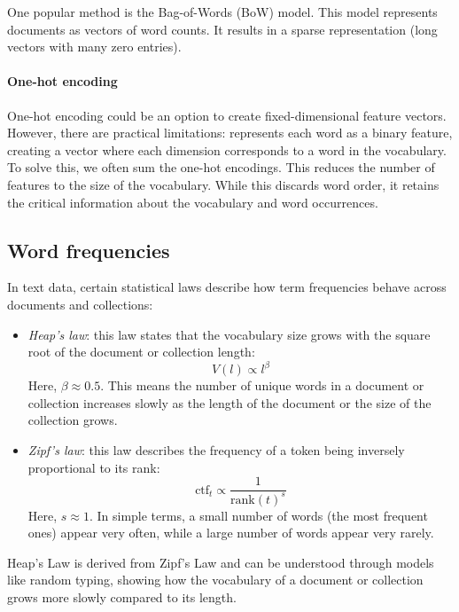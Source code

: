 One popular method is the Bag-of-Words (BoW) model.
This model represents documents as vectors of word counts.
It results in a sparse representation (long vectors with many zero entries).

\paragraph*{One-hot encoding}
One-hot encoding could be an option to create fixed-dimensional feature vectors. 
However, there are practical limitations: represents each word as a binary feature, creating a vector where each dimension corresponds to a word in the vocabulary.
To solve this, we often sum the one-hot encodings. 
This reduces the number of features to the size of the vocabulary.
While this discards word order, it retains the critical information about the vocabulary and word occurrences.

\subsection{Word frequencies}
In text data, certain statistical laws describe how term frequencies behave across documents and collections:
\begin{itemize}
    \item \textit{Heap's law}: this law states that the vocabulary size grows with the square root of the document or collection length:
        \[V(l)\propto l^{\beta}\]
        Here, $\beta \approx 0.5$. 
        This means the number of unique words in a document or collection increases slowly as the length of the document or the size of the collection grows.
    \item \textit{Zipf's law}: this law describes the frequency of a token being inversely proportional to its rank:
        \[\text{ctf}_t\propto\dfrac{1}{\text{rank}(t)^s}\]
        Here, $s\approx 1$. 
        In simple terms, a small number of words (the most frequent ones) appear very often, while a large number of words appear very rarely. 
\end{itemize}
\noindent Heap's Law is derived from Zipf's Law and can be understood through models like random typing, showing how the vocabulary of a document or collection grows more slowly compared to its length.

